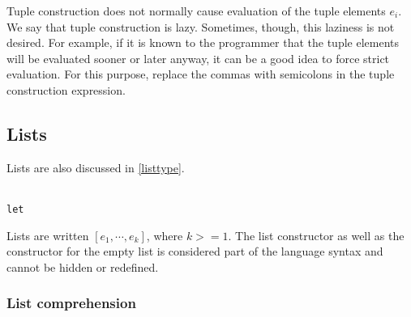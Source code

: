 Tuple construction does not normally cause evaluation of the tuple elements $e_i$. We say that tuple construction is lazy. Sometimes, though, this laziness is not desired. For example, if it is known to the programmer that the tuple elements will be evaluated sooner or later anyway, it can be a good idea to force strict evaluation. For this purpose, replace the commas with semicolons in the tuple construction expression.

\subsection{Lists} \label{listterm} 

Lists are also discussed in \autoref{listtype}.

\begin{flushleft}
 \sym{[]}  
  \alt{} \bracka{}\brackz{}
  \alt{} \sym{[}  \sym{$|$}  \sym{]} \\
  \term{$\leftarrow$} 
  \alt {}
  \alt  \texttt{let} \bracea{}  \bracez{}\\
\end{flushleft}

Lists are written $[e_1, \cdots, e_k]$, where $k>=1$. The list constructor \sym{:} as well as the constructor for the empty list \sym{[]} is considered part of the language syntax and cannot be hidden or redefined.


\subsubsection{List comprehension}  

